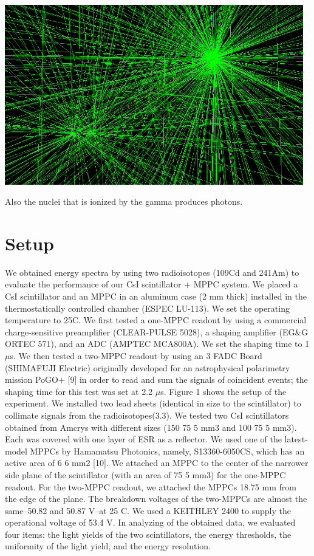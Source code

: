 \documentclass[12pt, a4paper,titlepage]{article}
\numberwithin{equation}{section}
\numberwithin{figure}{section}
\begin{document}
\includegraphics[width=130.0mm]{images/secondary2.png}

Also the nuclei that is ionized by the gamma produces photons.

\section{Setup}

We obtained energy spectra by using two radioisotopes (109Cd and 241Am) to evaluate the performance of our CsI scintillator + MPPC system. We placed a CsI scintillator and an MPPC in an aluminum case (2 mm thick) installed in the thermostatically controlled chamber (ESPEC LU-113). We set the operating temperature to 25C. We first tested a one-MPPC readout by using a commercial charge-sensitive preamplifier (CLEAR-PULSE 5028), a shaping amplifier (EG\&G ORTEC 571), and an ADC (AMPTEC MCA800A). We set the shaping time to 1 $\mu$s. We then tested a two-MPPC readout by using an 3 FADC Board (SHIMAFUJI Electric) originally developed for an astrophysical polarimetry mission PoGO+ [9] in order to read and sum the signals of coincident events; the shaping time for this test was set at 2.2 $\mu$s.
Figure 1 shows the setup of the experiment. We installed two lead sheets (identical in size to the scintillator) to collimate signals from the radioisotopes(3.3). We tested two CsI scintillators obtained from Amcrys with different sizes (150  75  5 mm3 and 100  75  5 mm3). Each was covered with one layer of ESR as a reflector. We used one of the latest-model MPPCs by Hamamatsu Photonics, namely, S13360-6050CS, which has an active area of 6  6 mm2 [10]. We attached an MPPC to the center of the narrower side plane of the scintillator (with an area of 75  5 mm3) for the one-MPPC readout. For the two-MPPC readout, we attached the MPPCs 18.75 mm from the edge of the plane. The breakdown voltages of the two-MPPCs are almost the same–50.82 and 50.87 V–at 25 C. We used a KEITHLEY 2400 to supply the operational voltage of 53.4 V. In analyzing of the obtained data, we evaluated four items:
the light yields of the two scintillators, the energy thresholds, the
uniformity of the light yield, and the energy resolution.
\end{document}
